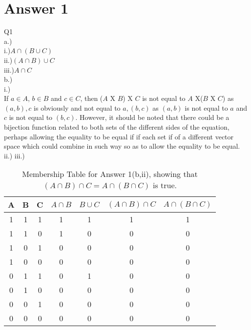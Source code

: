 \documentclass[11pt]{article}
\begin{document}
\section*{Answer 1}
Q1\\
a.)\\
i.)$A \cap (B\cup C)$\\
ii.)$(A \cap B)\cup C$\\
iii.)$A \cap C$\\
b.)\\
i.)\\
If $a \in A$, $b \in B$ and $c \in C$, then ($A$ X $B$) X $C$ is not equal to $A$ X($B$ X $C$) as {$(a,b),c$} is obviously and not equal to {$a,(b,c)$} as $(a,b)$ is not equal to $a$ and $c$ is not equal to $(b,c)$. However, it should be noted that there could be a bijection function related to both sets of the different sides of the equation, perhaps allowing the equality to be equal if if each set if of a different vector space which could combine in such way so as to allow the equality to be equal.\\

ii.) iii.)\\
\begin{table}[h]
\small
\centering
\caption{Membership Table for Answer 1(b,ii), showing that $(A\cap B)\cap C = A \cap(B \cap C)$ is true.}
\label{table:example}
\begin{tabular}{|c|c|c|c|c|c|c}	%
\hline 							%
\textbf{A} & \textbf{B} & \textbf{C} & \textbf{$A \cap B$} & \textbf{$B \cup C$} & \textbf{$(A \cap B)\cap C$} & \textbf{$A \cap (B \cap C)$}\\%
\hline 
\hline 
1 & 1 & 1 & 1 & 1 & 1 & 1 \\%
1 & 1 & 0 & 1 & 0 & 0 & 0 \\
1 & 0 & 1 & 0 & 0 & 0 & 0 \\
1 & 0 & 0 & 0 & 0 & 0 & 0 \\
0 & 1 & 1 & 0 & 1 & 0 & 0 \\
0 & 1 & 0 & 0 & 0 & 0 & 0 \\
0 & 0 & 1 & 0 & 0 & 0 & 0 \\
0 & 0 & 0 & 0 & 0 & 0 & 0 \\
\hline


\end{tabular}
\end{table}
\end{document}
